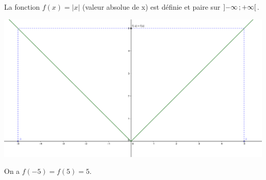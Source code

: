 \begin{myex}
		La fonction $f(x) = |x| $ (valeur absolue de x) est définie et paire sur $\mbox{\ensuremath{\left]- \infty\mathpunct{};+ \infty\right[}} $.
		
		\begin{center}
			\includegraphics[scale=0.45]{img/paire}
		\end{center}
		
		On a $f(-5) = f(5) = 5$.
	\end{myex}